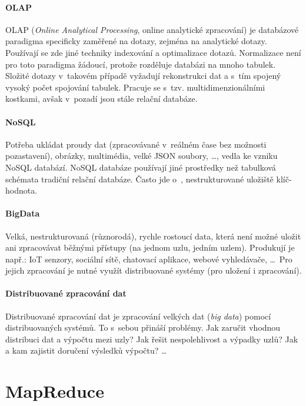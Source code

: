 \paragraph*{OLAP} OLAP (\textit{Online Analytical Processing}, online analytické zpracování) je databázové paradigma specificky zaměřené na dotazy, zejména na analytické dotazy. Používají se zde jiné techniky indexování a optimalizace dotazů. Normalizace není pro toto paradigma žádoucí, protože rozděluje databázi na mnoho tabulek. Složité dotazy v~takovém případě vyžadují rekonstrukci dat a s~tím spojený vysoký počet spojování tabulek. Pracuje se s~tzv. multidimenzionálními kostkami, avšak v~pozadí jsou stále relační databáze.

\paragraph*{NoSQL} Potřeba ukládat proudy dat (zpracovávané v~reálném čase bez možnosti pozastavení), obrázky, multimédia, velké JSON soubory, \dots, vedla ke vzniku NoSQL databází. NoSQL databáze používají jiné prostředky než tabulková schémata tradiční relační databáze. Často jde o~, nestrukturované uložiště klíč-hodnota.

\paragraph*{BigData} Velká, nestrukturovaná (různorodá), rychle rostoucí data, která není možné uložit ani zpracovávat běžnými přístupy (na jednom uzlu, jedním uzlem). Produkují je např.: IoT senzory, sociální sítě, chatovací aplikace, webové vyhledávače, \dots \, Pro jejich zpracování je nutné využít distribuované systémy (pro uložení i zpracování).

\paragraph*{Distribuované zpracování dat} Distribuované zpracování dat je zpracování velkých dat (\textit{big data}) pomocí distribuovaných systémů. To s~sebou přináší problémy. Jak zaručit vhodnou distribuci dat a výpočtu mezi uzly? Jak řešit nespolehlivost a výpadky uzlů? Jak a kam zajistit doručení výsledků výpočtu? \dots


\section{MapReduce}


